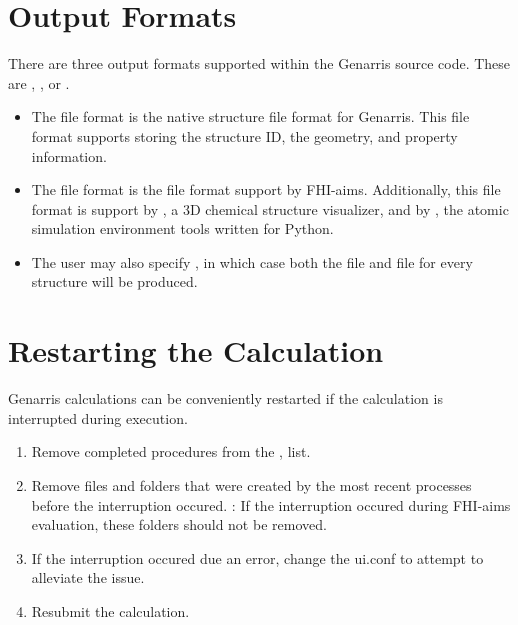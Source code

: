 \documentclass[letterpaper,10pt,english]{sphinxmanual}
\begin{document}
\section{Output Formats}
\label{\detokenize{index:output-formats}}
There are three output formats supported within the Genarris source code. These
are , , or .
\begin{itemize}
\item {} 
The  file format is the native structure file format for Genarris.
This file format supports storing the structure ID, the geometry, and
property information.

\item {} 
The  file format is the file format support by FHI-aims. Additionally,
this file format is support by  , a 3D chemical structure visualizer,
and by , the atomic simulation environment tools written for Python.

\item {} 
The user may also specify , in which case both the  file
and  file for every structure will be produced.

\end{itemize}


\section{Restarting the Calculation}
\vspace{-0.5 cm}
\label{\detokenize{index:restarting-the-calculation}}
Genarris calculations can be conveniently restarted if the calculation is
interrupted during execution.
\begin{enumerate}
\def\theenumi{\arabic{enumi}}
\def\labelenumi{\theenumi .}
\makeatletter\def\p@enumii{\p@enumi \theenumi .}\makeatother
\item {} 
Remove completed procedures from the , 
list.

\item {} 
Remove files and folders that were created by the most recent processes
before the interruption occured. : If the interruption occured
during FHI-aims evaluation, these folders should not be removed.

\item {} 
If the interruption occured due an error, change the
ui.conf to attempt to alleviate the issue.

\item {} 
Resubmit the calculation.

\end{enumerate}
\end{document}
